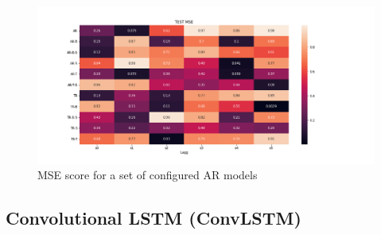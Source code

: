 \begin{table}[h]
    \centering
    \caption{Configuration of \acrshort{ar}-models. $\times$ denoted not applied, \checked denotes applied. \textbf{Bruk denne for tre eksempler.}}
    \label{tab:ar_model_config}
\end{table}

\begin{figure}
    \centering
    \includegraphics[scale = 0.5]{python_figs/MSE_score_AR_models.png}
    \caption{MSE score for a set of configured AR models}
    \label{fig:results_ar_models}
\end{figure}

\subsection{Convolutional LSTM (ConvLSTM)}

